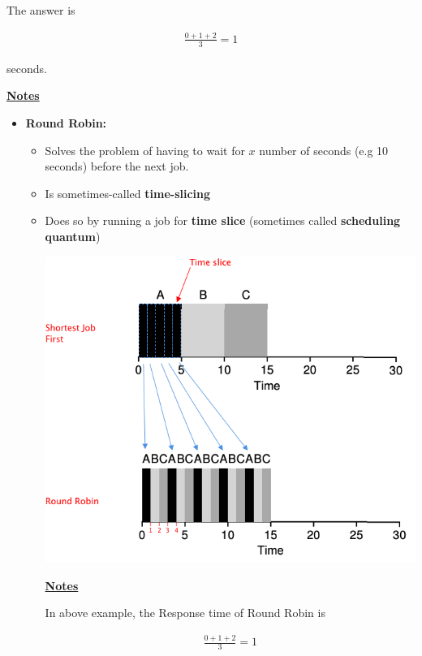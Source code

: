 \documentclass[12pt]{article}
\begin{document}
\begin{enumerate}[1.]
    \bigskip

    The answer is


    \begin{align}
        \frac{0 + 1 + 2}{3} = 1
    \end{align}

    seconds.

    \bigskip

    \underline{\textbf{Notes}}

    \begin{itemize}
        \item \textbf{Round Robin:}

        \begin{itemize}
            \item Solves the problem of having to wait for $x$ number of seconds (e.g 10 seconds)
            before the next job.
            \item Is sometimes-called \textbf{time-slicing}
            \item Does so by running a job for \textbf{time slice} (sometimes called \textbf{scheduling quantum})


            \begin{center}
            \includegraphics[width=0.8\linewidth]{images/worksheet_4_solution_4.png}
            \end{center}

            \bigskip

            \underline{\textbf{Notes}}

            \bigskip

            In above example, the Response time of Round Robin is

            \begin{align}
                \frac{0 + 1 + 2}{3} = 1
            \end{align}


\end{itemize}
\end{itemize}
\end{enumerate}
\end{document}
